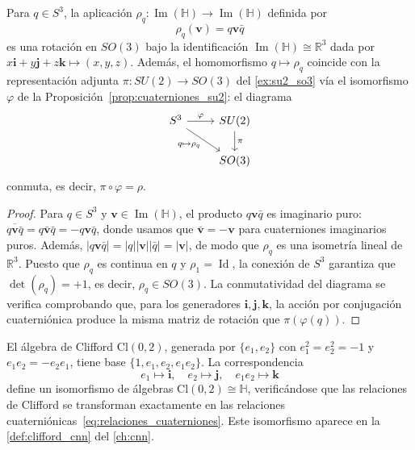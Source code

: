\begin{proposition}\label{prop:rotaciones_cuaterniones}
Para $q \in S^3$, la aplicación $\rho_q: \operatorname{Im}(\mathbb{H}) \to \operatorname{Im}(\mathbb{H})$ definida por
\begin{equation}\label{eq:rotacion_cuaterniones}
\rho_q(\mathbf{v}) = q\mathbf{v}\bar{q}
\end{equation}
es una rotación en $SO(3)$ bajo la identificación $\operatorname{Im}(\mathbb{H}) \cong \mathbb{R}^3$ dada por $x\mathbf{i} + y\mathbf{j} + z\mathbf{k} \mapsto (x, y, z)$. Además, el homomorfismo $q \mapsto \rho_q$ coincide con la representación adjunta $\pi: SU(2) \to SO(3)$ del \autoref{ex:su2_so3} vía el isomorfismo $\varphi$ de la Proposición~\ref{prop:cuaterniones_su2}: el diagrama
\[
\begin{tikzcd}
S^3 \arrow{r}{\varphi} \arrow[swap]{dr}{q \mapsto \rho_q} & SU(2) \arrow{d}{\pi} \\
 & SO(3)
\end{tikzcd}
\]
conmuta, es decir, $\pi \circ \varphi = \rho$.
\end{proposition}

\begin{proof}
Para $q \in S^3$ y $\mathbf{v} \in \operatorname{Im}(\mathbb{H})$, el producto $q\mathbf{v}\bar{q}$ es imaginario puro: $\overline{q\mathbf{v}\bar{q}} = q\bar{\mathbf{v}}\bar{q} = -q\mathbf{v}\bar{q}$, donde usamos que $\bar{\mathbf{v}} = -\mathbf{v}$ para cuaterniones imaginarios puros. Además, $|q\mathbf{v}\bar{q}| = |q||\mathbf{v}||\bar{q}| = |\mathbf{v}|$, de modo que $\rho_q$ es una isometría lineal de $\mathbb{R}^3$. Puesto que $\rho_q$ es continua en $q$ y $\rho_1 = \operatorname{Id}$, la conexión de $S^3$ garantiza que $\det(\rho_q) = +1$, es decir, $\rho_q \in SO(3)$. La conmutatividad del diagrama se verifica comprobando que, para los generadores $\mathbf{i}, \mathbf{j}, \mathbf{k}$, la acción por conjugación cuaterniónica produce la misma matriz de rotación que $\pi(\varphi(q))$.
\end{proof}

\begin{remark}\label{rem:cuaterniones_clifford}
El álgebra de Clifford $\text{Cl}(0,2)$, generada por $\{e_1, e_2\}$ con $e_1^2 = e_2^2 = -1$ y $e_1 e_2 = -e_2 e_1$, tiene base $\{1, e_1, e_2, e_1 e_2\}$. La correspondencia
\[
e_1 \mapsto \mathbf{i}, \quad e_2 \mapsto \mathbf{j}, \quad e_1 e_2 \mapsto \mathbf{k}
\]
define un isomorfismo de álgebras $\text{Cl}(0,2) \cong \mathbb{H}$, verificándose que las relaciones de Clifford se transforman exactamente en las relaciones cuaterniónicas~\eqref{eq:relaciones_cuaterniones}. Este isomorfismo aparece en la \autoref{def:clifford_cnn} del \autoref{ch:cnn}.
\end{remark}

